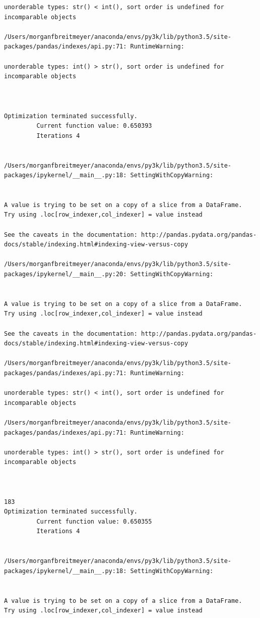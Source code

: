 \begin{lstlisting}
unorderable types: str() < int(), sort order is undefined for incomparable objects

/Users/morganfbreitmeyer/anaconda/envs/py3k/lib/python3.5/site-packages/pandas/indexes/api.py:71: RuntimeWarning:

unorderable types: int() > str(), sort order is undefined for incomparable objects



Optimization terminated successfully.
         Current function value: 0.650393
         Iterations 4


/Users/morganfbreitmeyer/anaconda/envs/py3k/lib/python3.5/site-packages/ipykernel/__main__.py:18: SettingWithCopyWarning:


A value is trying to be set on a copy of a slice from a DataFrame.
Try using .loc[row_indexer,col_indexer] = value instead

See the caveats in the documentation: http://pandas.pydata.org/pandas-docs/stable/indexing.html#indexing-view-versus-copy

/Users/morganfbreitmeyer/anaconda/envs/py3k/lib/python3.5/site-packages/ipykernel/__main__.py:20: SettingWithCopyWarning:


A value is trying to be set on a copy of a slice from a DataFrame.
Try using .loc[row_indexer,col_indexer] = value instead

See the caveats in the documentation: http://pandas.pydata.org/pandas-docs/stable/indexing.html#indexing-view-versus-copy

/Users/morganfbreitmeyer/anaconda/envs/py3k/lib/python3.5/site-packages/pandas/indexes/api.py:71: RuntimeWarning:

unorderable types: str() < int(), sort order is undefined for incomparable objects

/Users/morganfbreitmeyer/anaconda/envs/py3k/lib/python3.5/site-packages/pandas/indexes/api.py:71: RuntimeWarning:

unorderable types: int() > str(), sort order is undefined for incomparable objects



183
Optimization terminated successfully.
         Current function value: 0.650355
         Iterations 4


/Users/morganfbreitmeyer/anaconda/envs/py3k/lib/python3.5/site-packages/ipykernel/__main__.py:18: SettingWithCopyWarning:


A value is trying to be set on a copy of a slice from a DataFrame.
Try using .loc[row_indexer,col_indexer] = value instead


\end{lstlisting}
